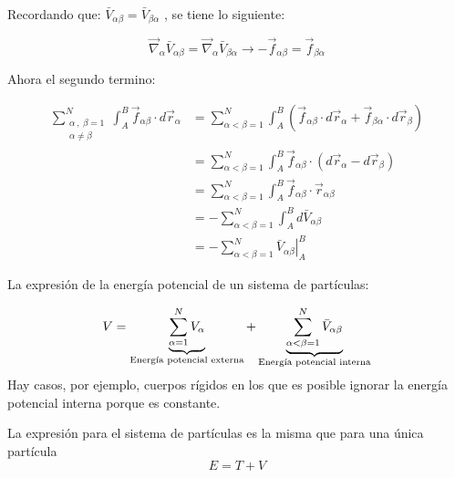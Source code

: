 \documentclass[/home/hernan-barquero/Documents/Apuntes_mecanica_teorica/main.tex]{subfiles}
\begin{document}
	Recordando que: $\bar{V}_{\alpha \beta} = \bar{V}_{\beta \alpha}$ , se tiene lo siguiente:

	\begin{equation*}
		\vec{\nabla}_{\alpha} \bar{V}_{\alpha \beta} = \vec{\nabla}_{\alpha} \bar{V}_{\beta \alpha} \rightarrow -\vec{f}_{\alpha \beta} = \vec{f}_{\beta \alpha}
	\end{equation*}

	Ahora el segundo termino:

	\begin{align*}
		\sum_{\left . \begin{matrix} \alpha \: , \: \beta = 1\\ \alpha \neq \beta \end{matrix} \right .}^{N} \int_{A}^{B} \vec{f}_{\alpha \beta} \cdot d\vec{r}_{\alpha} &= \sum_{ \alpha < \beta = 1}^{N} \int_{A}^{B} \left(\vec{f}_{\alpha \beta} \cdot d\vec{r}_{\alpha} +  \vec{f}_{\beta \alpha} \cdot d\vec{r}_{\beta} \right) \\ 
		& = \sum_{ \alpha < \beta = 1}^{N} \int_{A}^{B} \vec{f}_{\alpha \beta} \cdot \left( d\vec{r}_{\alpha} -  d\vec{r}_{\beta} \right) \\
		& =  \sum_{ \alpha < \beta = 1}^{N} \int_{A}^{B} \vec{f}_{\alpha \beta} \cdot \vec{r}_{\alpha \beta} \\ 
		& = - \sum_{ \alpha < \beta = 1}^{N} \int_{A}^{B} d\bar{V}_{\alpha \beta} \\ 
		& = - \sum_{ \alpha < \beta = 1}^{N} \left . \bar{V}_{\alpha \beta} \right|_{A}^{B}
	\end{align*}

	\begin{definition}
		La expresión de la energía potencial de un sistema de partículas:

		\begin{equation}
			V = \underbrace{\sum_{\alpha = 1}^{N} V_{\alpha}}_{\textup{Energía potencial externa}} + \underbrace{\sum_{ \alpha < \beta = 1}^{N} \bar{V}_{\alpha \beta}}_{\textup{Energía potencial interna}}
			\label{eq: potential}
		\end{equation}
		Hay casos, por ejemplo, cuerpos rígidos en los que es posible ignorar la energía potencial interna porque es constante.
	\end{definition}

	\begin{definition}
		La expresión para el sistema de partículas es la misma que para una única partícula 
		\begin{equation*}
			E = T + V
		\end{equation*}
	\end{definition}
\end{document}
